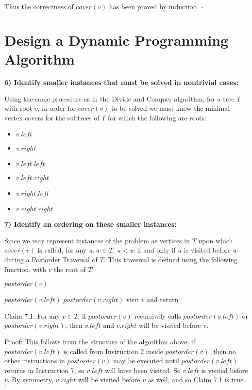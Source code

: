 \documentclass{article}
\begin{document}
Thus the correctness of $cover(v)$ has been proved by induction. $\square$

\section{Design a Dynamic Programming Algorithm}

\textbf{6) Identify smaller instances that must be solved in nontrivial cases:}

Using the same procedure as in the Divide and Conquer algorithm, for a tree $T$
with root $v$, in order for $cover(v)$ to be solved we must know the minimal
vertex covers for the subtrees of $T$ for which the following are roots:
\begin{itemize}
\item $v.left$
\item $v.right$
\item $v.left.left$
\item $v.left.right$
\item $v.right.left$
\item $v.right.right$
\end{itemize}

\textbf{7) Identify an ordering on these smaller instances:}

Since we may represent instances of the problem as vertices in $T$ upon which
$cover(v)$ is called, for any $u,w \in T$, $u<w$ if and only if $u$ is visited
before $w$ during a Postorder Traversal of $T$. This traversal is defined using
the following function, with $v$ the root of $T$:

$postorder(v)$
\begin{algorithmic}[1]
	\STATE $postorder(v.left)$
\ENDIF
{}
	\STATE $postorder(v.right)$
\ENDIF
\STATE visit $v$ and return
\end{algorithmic}

Claim 7.1: For any $v \in T$, if $postorder(v)$ recursively calls
$postorder(v.left)$ or $postorder(v.right)$, then $v.left$ and $v.right$ will
be visited before $v$.

Proof: This follows from the structure of the algorithm above; if
$postorder(v.left)$ is called from Instruction 2 inside $postorder(v)$, then no
other instructions in $postorder(v)$ may be executed until $postorder(v.left)$
returns in Instruction 7, so $v.left$ will have been visited. So $v.left$ is
visited before $v$. By symmetry, $v.right$ will be visited before $v$ as
well, and so Claim 7.1 is true. $\square$
\end{document}
